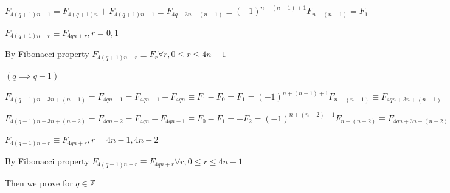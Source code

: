 \documentclass{article}
\begin{document}
$F_{4(q+1)n+1} = F_{4(q+1)n} + F_{4(q+1)n - 1} \equiv F_{4q+3n+(n-1)} \equiv (-1)^{n+(n-1)+1}F_{n-(n-1)} = F_1$

$F_{4(q+1)n+r} \equiv F_{4qn+r}, r = 0, 1$

By Fibonacci property $F_{4(q+1)n+r} \equiv F_r \forall r, 0 \leq r \leq 4n -1$

$(q \implies q - 1)$

$F_{4(q-1)n + 3n + (n-1)} = F_{4qn - 1} = F_{4qn+1} - F_{4qn} \equiv F_1 - F_0 = F_1 = (-1)^{n+(n-1)+1}F_{n-(n-1)} \equiv F_{4qn + 3n + (n-1)}$

$F_{4(q-1)n + 3n + (n-2)} = F_{4qn - 2} = F_{4qn} - F_{4qn-1} \equiv F_0 - F_1 = -F_2 = (-1)^{n+(n-2)+1}F_{n-(n-2)} \equiv F_{4qn + 3n + (n-2)}$

$F_{4(q-1)n + r} \equiv F_{4qn + r}, r = 4n-1, 4n-2$

By Fibonacci property $F_{4(q-1)n+r} \equiv F_{4qn + r} \forall r, 0 \leq r \leq 4n - 1$

Then we prove for $q \in \mathbb{Z}$
\end{document}
